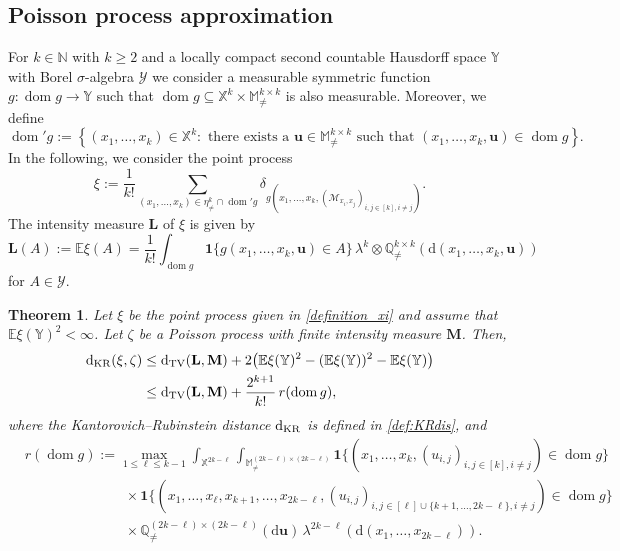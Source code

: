 \documentclass{article}
\newtheorem{theorem}{Theorem}[section]
\theoremstyle{definition}
\numberwithin{equation}{section}
\theoremstyle{remark}
\newcommand{\E}{\mathbb{E}}
\begin{document}
\subsection{Poisson process approximation}

For $k\in\mathbb{N}$ with $k\geq2$ and a locally compact second countable Hausdorff space $\mathbb{Y}$ with Borel $\sigma$-algebra $\mathcal{Y}$ we consider a measurable symmetric function $g: \operatorname{dom} g\to\mathbb{Y}$ such that $\operatorname{dom} g\subseteq \mathbb{X}^k\times \mathbb{M}^{k\times k}_{\neq}$ is also measurable. Moreover, we define
$$
{\operatorname{dom}'} g := \left\{( x_1, \ldots, x_k)\in\mathbb{X}^k : \text{ there exists a } \mathbf{u}\in\mathbb{M}^{k\times k}_{\neq} \text{ such that } \left( x_1, \ldots, x_k, \mathbf{u} \right) \in  \operatorname{dom} g\right\}.
$$
In the following, we consider the point process
\begin{equation}\label{definition_xi}
	\xi:= \frac{1}{k!}\sum_{(x_1, \ldots, x_k) \in \eta^k_{\neq}\cap  {\operatorname{dom}'} g}  \delta_{g \left( x_1, \ldots, x_k, (\mathcal{M}_{x_i,x_j})_{i,j\in[k], i \neq j} \right)}.
\end{equation}
The intensity measure $\mathbf{L}$ of $\xi$ is given by
$$
\mathbf{L}(A):= \mathbb{E} \xi(A) =\frac{1}{k!} \int_{\operatorname{dom} g} \mathbf{1}\{ g(x_1,\ldots,x_k,\mathbf{u})\in A \} \, \lambda^k\otimes \mathbb{Q}_{\neq}^{k\times k}(\mathrm{d} (x_1,\ldots,x_k,\mathbf{u})) 
$$
for $A\in\mathcal{Y}$.

\begin{theorem} \label{Poisson_process_approximation}
Let $\xi$ be the point process given in \eqref{definition_xi} and assume that $\E \xi(\mathbb{Y})^2<\infty$. Let $\zeta$ be a Poisson process with finite intensity measure $\mathbf{M}$. Then,
    \begin{align*}
        \mathrm{d}_{\rm KR}({\xi}, \zeta) & \leq \mathrm{d}_{\mathrm{TV}}(\mathbf{L},\mathbf{M}) + 2 \big( \E \xi(\mathbb{Y})^2 - (\E \xi(\mathbb{Y}))^2 - \E \xi(\mathbb{Y}) \big) \\
        & \leq \mathrm{d}_{\mathrm{TV}}(\mathbf{L},\mathbf{M}) + \frac{2^{k+1}}{k!} \, r(\operatorname{dom} g),
    \end{align*}
where the Kantorovich--Rubinstein distance $\mathrm{d}_{\rm KR}$ is defined in \eqref{def:KRdis}, and
\begin{align*}
  &  r(\operatorname{dom} g) := \max_{1 \leq \ell \leq k-1} 
\int_{\mathbb{X}^{2k-\ell}} \int_{\mathbb{M}^{(2k-\ell)\times (2k-\ell)}_{\neq}}  
\mathbf{1}\big\{ ( {x}_1, \ldots, {x}_k , (u_{i,j})_{i,j\in[k],i\neq j} ) \in \operatorname{dom} g  \big\}  \\
&  \hspace{3cm} \times \mathbf{1}\big\{ ( {x}_1, \ldots, {x}_\ell, {x}_{k+1}, \ldots, {x}_{2k-\ell}, (u_{i,j})_{i,j\in [\ell]\cup\{k+1,\ldots,2k-\ell\}, i\neq j} ) \in \operatorname{dom} g \big\} \\
& \hspace{3cm} \times  \mathbb{Q}^{(2k-\ell)\times(2k-\ell)}_{\neq} (\mathrm{d}\mathbf{u}) \, \lambda^{2k-\ell}(\mathrm{d}(x_1,\ldots,x_{2k-\ell})).
\end{align*}  
\end{theorem}
\end{document}
